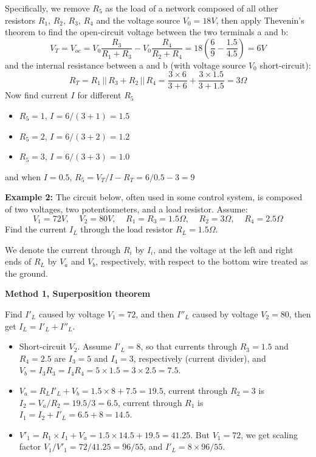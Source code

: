 \begin{itemize}
Specifically, we remove $R_5$ as the load of a network composed of all other
resistors $R_1$, $R_2$, $R_3$, $R_4$ and the voltage source $V_0=18V$, then
apply Thevenin's theorem to find the open-circuit voltage between the two
terminals a and b:
\[	
V_T=V_{oc}=V_0\frac{R_3}{R_1+R_3}-V_0\frac{R_4}{R_2+R_4}
=18 \left(\frac{6}{9}-\frac{1.5}{4.5}\right)=6V 
\]
and the internal resistance between a and b (with voltage source $V_0$ 
short-circuit):
\[ 
R_T=R_1\,||\,R_3+R_2\,||\,R_4
=\frac{3\times 6}{3+6}+\frac{3\times 1.5}{3+1.5}=3\Omega 
\]
Now find current $I$ for different $R_5$
\begin{itemize}
\item $R_5=1$, $I=6/(3+1)=1.5$
\item $R_5=2$, $I=6/(3+2)=1.2$
\item $R_5=3$, $I=6/(3+3)=1.0$
\end{itemize}
and when $I=0.5$, $R_5=V_T/I-R_T=6/0.5-3=9$


{\bf Example 2: } The circuit below, often used in some control system, 
is composed of two voltages, two potentiometers, and a load resistor.
Assume:
\[
V_1=72V,\;\;\;\;V_2=80V,\;\;\;\;R_1=R_3=1.5\Omega,\;\;\;\;R_2=3\Omega,
\;\;\;\;R_4=2.5\Omega
\]
Find the current $I_L$ through the load resistor $R_L=1.5\Omega$. 

We denote the current through $R_i$ by $I_i$, and the voltage at the left 
and right ends of $R_L$ by $V_a$ and $V_b$, respectively, with respect to 
the bottom wire treated as the ground.


{\bf Method 1, Superposition theorem}

Find $I'_L$ caused by voltage $V_1=72$, and then $I''_L$ caused by voltage
$V_2=80$, then get $I_L=I'_L+I''_L$.

\begin{itemize}

\item Short-circuit $V_2$. Assume $I'_L=8$, so that currents through
	$R_3=1.5$ and $R_4=2.5$ are $I_3=5$ and $I_4=3$, respectively
	(current divider), and $V_b=I_3R_3=I_4R_4=5\times 1.5=3\times 2.5=7.5$.
\item $V_a=R_L I'_L+V_b=1.5\times 8+7.5=19.5$, current through $R_2=3$
	is $I_2=V_a/R_2=19.5/3=6.5$, current through $R_1$ is 
	$I_1=I_2+I'_L=6.5+8=14.5$.
\item $V'_1=R_1\times I_1+V_a=1.5\times 14.5+19.5=41.25$. But $V_1=72$,
	we get scaling factor $V_1/V'_1=72/41.25=96/55$, and 
	$I'_L=8 \times 96/55$.


\end{itemize}
\end{itemize}
